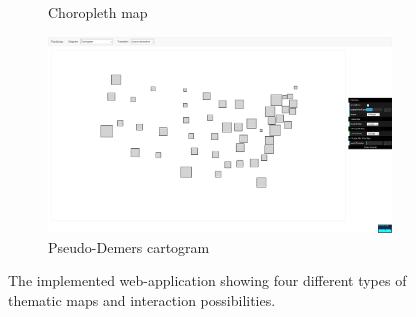 \begin{figure}
\begin{subfigure}[b]{0.475\textwidth}
        \caption[Choropleth map]%
        {{\small Choropleth map}}
        \label{f:showcase-choropleth}
    \end{subfigure}
    \quad
    \begin{subfigure}[b]{0.475\textwidth}
        \centering
        \includegraphics[width=\textwidth]{images/results/map_cartogram.png}
        \caption[Pseudo-Demers cartogram]%
        {{\small Pseudo-Demers cartogram}}
        \label{f:showcase-cartogram}
    \end{subfigure}
    \caption[The implemented web-application showing four different types of thematic maps and interaction possibilities.]
    {\small The implemented web-application showing four different types of thematic maps and interaction possibilities.}
    \label{f:showcase-overall}
\end{figure}
